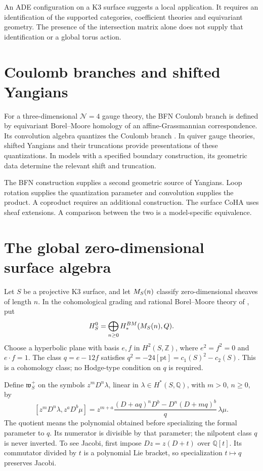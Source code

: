 An ADE configuration on a K3 surface suggests a local application.
It requires an identification of the supported categories, coefficient
theories and equivariant geometry. The presence of the intersection
matrix alone does not supply that identification or a global torus action.

\section{Coulomb branches and shifted Yangians}
For a three-dimensional $\mathcal N=4$ gauge theory, the BFN Coulomb branch is defined by equivariant Borel--Moore homology of an affine-Grassmannian correspondence. Its convolution algebra quantizes the Coulomb branch \cite{BFN}. In quiver gauge theories, shifted Yangians and their truncations provide presentations of these quantizations. In models with a specified boundary construction, its geometric data determine the relevant shift and truncation.

The BFN construction supplies a second geometric source of Yangians. Loop rotation supplies the quantization parameter and convolution
supplies the product. A coproduct requires an additional construction.
The surface CoHA uses sheaf extensions. A comparison between the two is a model-specific equivalence.

\section{The global zero-dimensional surface algebra}
Let $S$ be a projective K3 surface, and let $M_S(n)$ classify
zero-dimensional sheaves of length $n$. In the cohomological grading
and rational Borel--Moore theory of \cite{MMSVSurface}, put
\[
 H_S^0=\bigoplus_{n\geq0}H_*^{BM}(M_S(n),Q).
\]
Choose a hyperbolic plane with basis $e,f$ in $H^2(S,\mathbb Z)$,
where $e^2=f^2=0$ and $e\cdot f=1$. The class
$q=e-12f$ satisfies
$q^2=-24[\mathrm{pt}]=c_1(S)^2-c_2(S)$.
This is a cohomology class; no Hodge-type condition on $q$ is required.

Define $\mathfrak w_S^+$ on the symbols
$z^mD^n\lambda$, linear in $\lambda\in H^*(S,\mathbb Q)$, with
$m>0$, $n\geq0$, by
\[
 [z^mD^n\lambda,z^aD^b\mu]
 =z^{m+a}\frac{(D+aq)^nD^b-D^n(D+mq)^b}{q}\,\lambda\mu.
\]
The quotient means the polynomial obtained before specializing the
formal parameter to $q$. Its numerator is divisible by that parameter;
the nilpotent class $q$ is never inverted. To see Jacobi, first impose
$Dz=z(D+t)$ over $\mathbb Q[t]$. Its commutator divided by $t$ is a
polynomial Lie bracket, so specialization $t\mapsto q$ preserves Jacobi.

